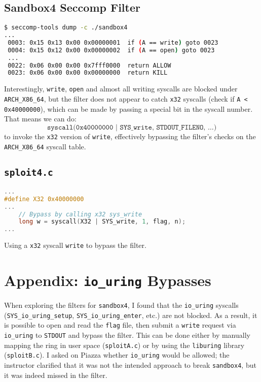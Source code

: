 \documentclass[11pt]{article}
\begin{document}
\subsection{Sandbox4 Seccomp Filter}
\begin{lstlisting}[language=bash]
$ seccomp-tools dump -c ./sandbox4
...
 0003: 0x15 0x13 0x00 0x00000001  if (A == write) goto 0023
 0004: 0x15 0x12 0x00 0x00000002  if (A == open) goto 0023
 ...
 0022: 0x06 0x00 0x00 0x7fff0000  return ALLOW
 0023: 0x06 0x00 0x00 0x00000000  return KILL
\end{lstlisting}

Interestingly, \texttt{write}, \texttt{open} and almost all writing syscalls are blocked under \texttt{ARCH\_X86\_64}, but the filter
does not appear to catch \texttt{x32} syscalls (check if \texttt{A < 0x40000000}), which can be made by passing a special bit in the syscall number. That means we can do:
\[
    \texttt{syscall(0x40000000 | SYS\_write, STDOUT\_FILENO, \ldots)}
\]
to invoke the \texttt{x32} version of \texttt{write}, effectively bypassing the filter's checks on the
\texttt{ARCH\_X86\_64} syscall table.

\subsection{\texttt{sploit4.c}}
\begin{lstlisting}[language=C]
...
#define X32 0x40000000
...
    // Bypass by calling x32 sys_write
    long w = syscall(X32 | SYS_write, 1, flag, n);
...
\end{lstlisting}
Using a \texttt{x32} syscall \texttt{write} to bypass the filter.

\newpage
\section{Appendix: \texttt{io\_uring} Bypasses}
\label{sec:io_uring}

When exploring the filters for \texttt{sandbox4}, I found that the
\texttt{io\_uring} syscalls (\texttt{SYS\_io\_uring\_setup}, \texttt{SYS\_io\_uring\_enter}, etc.) are not
blocked. As a result, it is possible to open and read the \texttt{flag} file, then submit a \texttt{write} request
via \texttt{io\_uring} to \texttt{STDOUT} and bypass the filter. This can be done either by manually mapping
the ring in user space (\texttt{sploitA.c}) or by using the \texttt{liburing} library (\texttt{sploitB.c}).
I asked on Piazza whether \texttt{io\_uring} would be allowed; the instructor clarified that it was not
the intended approach to break \texttt{sandbox4}, but it was indeed missed in the filter.
\end{document}
